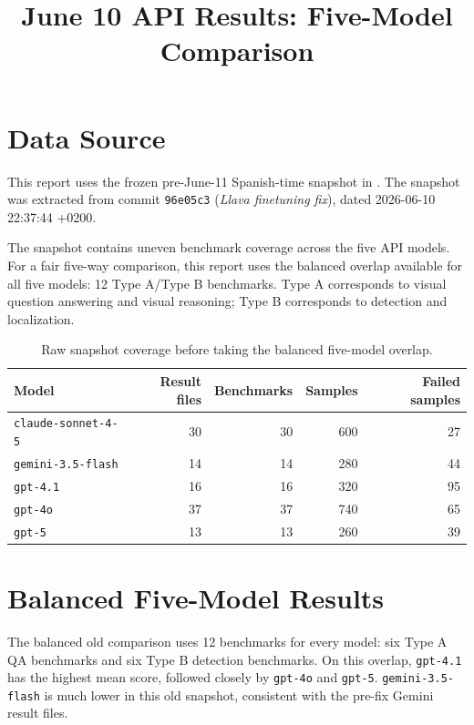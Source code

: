 \documentclass[11pt,a4paper]{article}
\title{\textbf{June 10 API Results: Five-Model Comparison}}
\author{}
\date{}
\newcommand{\code}[1]{\texttt{#1}}
\begin{document}
\maketitle

\section{Data Source}

This report uses the frozen pre-June-11 Spanish-time snapshot in
. The snapshot was extracted
from commit \code{96e05c3}
(\emph{Llava finetuning fix}), dated 2026-06-10 22:37:44 +0200.

The snapshot contains uneven benchmark coverage across the five API models.
For a fair five-way comparison, this report uses the balanced overlap available
for all five models: 12 Type A/Type B benchmarks. Type A corresponds to visual
question answering and visual reasoning; Type B corresponds to detection and
localization.

\begin{table}[H]
\centering
\small
\caption{Raw snapshot coverage before taking the balanced five-model overlap.}
\begin{tabularx}{\textwidth}{@{}lrrrr@{}}
\toprule
\textbf{Model} & \textbf{Result files} & \textbf{Benchmarks} & \textbf{Samples} & \textbf{Failed samples} \\
\midrule
\code{claude-sonnet-4-5} & 30 & 30 & 600 & 27 \\
\code{gemini-3.5-flash} & 14 & 14 & 280 & 44 \\
\code{gpt-4.1} & 16 & 16 & 320 & 95 \\
\code{gpt-4o} & 37 & 37 & 740 & 65 \\
\code{gpt-5} & 13 & 13 & 260 & 39 \\
\bottomrule
\end{tabularx}
\end{table}

\section{Balanced Five-Model Results}

The balanced old comparison uses 12 benchmarks for every model: six Type A QA
benchmarks and six Type B detection benchmarks. On this overlap,
\code{gpt-4.1} has the highest mean score, followed closely by
\code{gpt-4o} and \code{gpt-5}. \code{gemini-3.5-flash} is much lower in this
old snapshot, consistent with the pre-fix Gemini result files.
\end{document}
